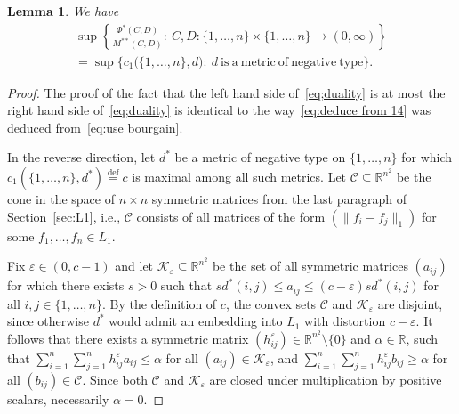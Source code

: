 \documentclass{icm2010}
\newtheorem{lemma}[theorem]{Lemma}
\theoremstyle{definition}
\newcommand{\R}{\mathbb{R}}
\newcommand{\eqdef}{\stackrel{\mathrm{def}}{=}}
\newcommand{\1}{\mathbf{1}}
\renewcommand{\le}{\leqslant}
\renewcommand{\ge}{\geqslant}
\newcommand{\e}{\varepsilon}
\begin{document}
\begin{lemma}\label{duality}
We have
\begin{multline}\label{eq;duality}
\sup\left\{\frac{\Phi^*(C,D)}{M^{**}(C,D)}:\
C,D:\{1,\ldots,n\}\times \{1,\ldots,n\}\to (0,\infty)\right\}\\=
\sup\Big\{c_1\big(\{1,\ldots,n\},d\big):\ d\ \mathrm{is\  a\ metric\
of\  negative\  type}\Big\}.
\end{multline}
\end{lemma}
\begin{proof} The proof of the fact that the left hand side
of~\eqref{eq;duality} is at most the right hand side
of~\eqref{eq;duality} is identical to the way~\eqref{eq:deduce from
14} was deduced from~\eqref{eq:use bourgain}.

In the reverse direction, let $d^*$ be a metric of negative type on
$\{1,\ldots,n\}$ for which $c_1(\{1,\ldots,n\},d^*)\eqdef c$ is
maximal among all such metrics. Let $\mathscr
C\subseteq \R^{n^2}$ be the cone in the space of $n\times n$
symmetric matrices from the last paragraph of Section~\ref{sec:L1},
i.e., $\mathscr C$ consists of all matrices of the form
$(\|f_i-f_j\|_1)$ for some $f_1,\ldots,f_n\in L_1$.

Fix $\e\in (0,c-1)$ and let $\mathscr K_\e\subseteq \R^{n^2}$ be the
set of all symmetric matrices $(a_{ij})$ for which there exists
$s>0$ such that $sd^*(i,j)\le a_{ij}\le (c-\e)sd^*(i,j)$ for all
$i,j\in \{1,\ldots,n\}$. By the definition of $c$, the convex sets
$\mathscr C$ and $\mathscr K_\e$ are disjoint, since otherwise $d^*$
would admit an embedding into $L_1$ with distortion $c-\e$. It
follows that there exists a symmetric matrix $(h_{ij}^\e)\in
\R^{n^2}\setminus\{0\}$ and $\alpha\in \R$, such that
$\sum_{i=1}^n\sum_{j=1}^n h_{ij}^\e a_{ij} \le \alpha$ for all
$(a_{ij})\in \mathscr K_\e$, and $\sum_{i=1}^n\sum_{j=1}^n h_{ij}^\e
b_{ij} \ge \alpha$ for all $(b_{ij})\in \mathscr C$. Since both
$\mathscr C$ and $\mathscr K_\e$ are closed under multiplication by
positive scalars, necessarily $\alpha=0$.


\end{proof}
\end{document}
